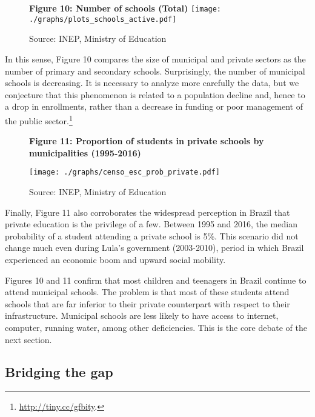 \documentclass[12pt,]{book}
\let\rmarkdownfootnote\footnote%
\def\footnote{\protect\rmarkdownfootnote}
\begin{document}
\begin{figure}
    \centering
    \textbf{Figure 10: Number of schools (Total)}
    \texttt{[image: ./graphs/plots\_schools\_active.pdf]}
    \caption*{\footnotesize \hfill Source: INEP, Ministry of Education}
\end{figure}

In this sense, Figure 10 compares the size of municipal and private sectors as the number of primary and secondary schools. Surprisingly, the number of municipal schools is decreasing. It is necessary to analyze more carefully the data, but we conjecture that this phenomenon is related to a population decline and, hence to a drop in enrollments, rather than a decrease in funding or poor management of the public sector.\footnote{\href{https://g1.globo.com/educacao/noticia/cai-numero-de-matriculas-no-ensino-fundamental-e-no-ensino-medio-das-escolas-publicas-diz-censo-escolar.ghtml}{http://tiny.cc/gfbity}.}

\begin{figure}
    \centering
    \textbf{\small Figure 11: Proportion of students in private schools by municipalities (1995-2016)}\par\medskip
    \texttt{[image: ./graphs/censo\_esc\_prob\_private.pdf]}
    \caption*{\footnotesize \hfill Source: INEP, Ministry of Education}
\end{figure}

Finally, Figure 11 also corroborates the widespread perception in Brazil that private education is the privilege of a few. Between 1995 and 2016, the median probability of a student attending a private school is 5\%. This scenario did not change much even during Lula's government (2003-2010), period in which Brazil experienced an economic boom and upward social mobility.

Figures 10 and 11 confirm that most children and teenagers in Brazil continue to attend municipal schools. The problem is that most of these students attend schools that are far inferior to their private counterpart with respect to their infrastructure. Municipal schools are less likely to have access to internet, computer, running water, among other deficiencies. This is the core debate of the next section.

\subsection{Bridging the gap}
\end{document}
